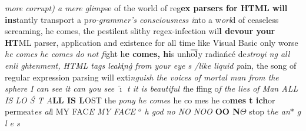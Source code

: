 \raggedright{}{\it more corrupt) a mere glimp}se
of the world of reg{\bf ex parsers for HTML will ins}tantly transport a
p{\it ro-grammer's consciousness i}nto a w{\it orl}d of ceaseless screaming, he
comes\strike{7em}, the pestilent slithy
regex-infection wil{\bf l devour your HT}ML
parser, application and existence for all time like Visual Basic only
worse {\it he comes he comes do not fi}ght
h{\bf e co\rlap{\lower 1pt\hbox{\ \ \thinspace,}}mes, hi}s
unh$\overline{\rm ol}$y radia\'nc\'e
de{\it stroyi\rayz{-1.5ex}{$\hat{}$\ }%
%
\rayzl{0pt}{>\ \thinspace}%
\rayzl{3pt}{<}%
ng all
enli%
%
%
%
%
ghtenment, HTML tags 
{\bfit leak\rayz{0pt}{$\widetilde{\phantom{ak}}$}\c{i}n\.g
from
you\rayz{-2pt}{$\underline{\phantom{ou}}$}r eye\rayz{-1.8ex}{$\vec{\phantom{e}}$}%
s\kern-4pt /\thinspace{}l\rayz{1.6ex}{,\hskip 1pt}ike
liq}uid p}ain, the song of re\rlap{\kern-2pt/}gular
expre\strike{6em}ssion parsing will
exti{\it nguish
the voices of mor{\bfit tal man from the sp}here
I can see it can you see
$\hat\imath$\rayz{2pt}{$\acute{}\,$}%
\rayz{-2.5ex}{$\grave{}$\thinspace}%
\rayzl{-1.9ex}{<\thinspace}%
\rayz{-2.0ex}{$_{{}_\vdash}$}%
t\rayz{1pt}{$\acute{}$}%
\rayzl{0pt}{$_{{}_{{}_\infty}}$}%
%
%
\rayz{-2.5ex}{--}%
\rayzl{-2.5ex}{<}%
\rayz{0pt}{$\underline{\phantom{it}}$}
it is beautiful t}he
f\thinspace{}\thinspace{}fing o{\it f the 
lie{\bfit s of Man ALL IS LO%
\'S%
\rayz{6pt}{$\ddot{}$}%
\rayz{8pt}{$\acute{}$}%
\rayzb{-1.6ex}{$^7\hat{\ }$}%
\rayzb{-1.5ex}{$=$}%
T A}}{\bf LL IS L}OST
the {\it po\rlap{\ \lil /}ny he come}s 
he c\rayz{-1.9ex}{$\breve{\ }$}o\rayz{1pt}{$\underline{\phantom{co}}$}%
m\strike{5.1em}es he co{\bf mes t ich}or
permeat{\it es al}l MY
FAC{\it E MY FACE $^o$\kern-1pt h god n{\bfit o NO NOO\rayzb{1.2pt}{$_{_{\bowtie}}$}%
}}{\bf OO N}$\Theta$ 
stop t{\sl he an\raise 2pt\hbox{$\ast$}%
\rayz{1ex}{$\wr$}\rayzl{1ex}{$\bar{\thinspace}$}%
\rayz{-1pt}{\_}\rayz{-2.3ex}{$\ddot{\thinspace}$}%
\rayz{-1.2ex}{\_}\rayz{-1.4ex}{\_}%
g\rayz{1ex}{$\wr$}\rayz{2.0ex}{$\neg$}%
l\rayz{2pt}{$\acute{\thinspace}$}%
\rayz{-1.6ex}{$\hat{\thinspace}$}\rayz{-1.0ex}{$_\neg$}\rayz{-2.2ex}{$\acute{}$}%
\rayz{-1.4ex}{\_}\rayz{-1.7ex}{\_}%
e\rayz{-2pt}{\tt \_}%
s}\graybox{2.5em}
